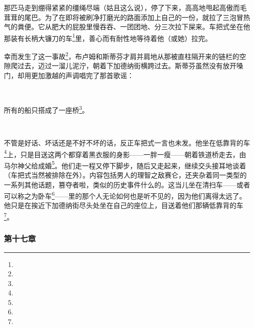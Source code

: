 \par 那匹马走到绷得紧紧的缰绳尽端（姑且这么说），停了下来，高高地甩起高傲而毛茸茸的尾巴。为了在即将被刷净打磨光的路面添加上自己的一份，就拉了三泡冒热气的粪便。它从肥大的屁股里慢吞吞、一团团地、分三次拉下屎来。车把式坐在他那装有长柄大镰刀的车\footnote{}里，善心而有耐性地等待着他（或她）拉完。
\par 幸而发生了这一事故\footnote{}，布卢姆和斯蒂芬才肩并肩地从那被直柱隔开来的链栏的空隙爬过去，迈过一溜儿泥泞，朝着下加德纳街横跨过去。斯蒂芬虽然没有放开嗓门，却用更加激越的声调唱完了那首歌谣：
\par  
\par 所有的船只搭成了一座桥\footnote{}。
\par  
\par 不管是好话、坏话还是不好不坏的话，反正车把式一言也未发。他坐在低靠背的车\footnote{}上，只是目送这两个都穿着黑衣服的身影——一胖一瘦——朝着铁道桥走去，由马尔神父给成婚\footnote{}。他们走一程又停下脚步，随后又走起来，继续交头接耳地谈着（车把式当然被排除在外）。内容包括男人的理智之敌赛仑，还夹杂着同一类型的一系列其他话题，篡夺者啦，类似的历史事件什么的。这当儿坐在清扫车——或者可以称之为卧车\footnote{}——里的那个人无论如何也是听不见的，因为他们离得太远了。他只是在挨近下加德纳街尽头处坐在自己的座位上，目送着他们那辆低靠背的车\footnote{}。





\subsubsection*{第十七章}


